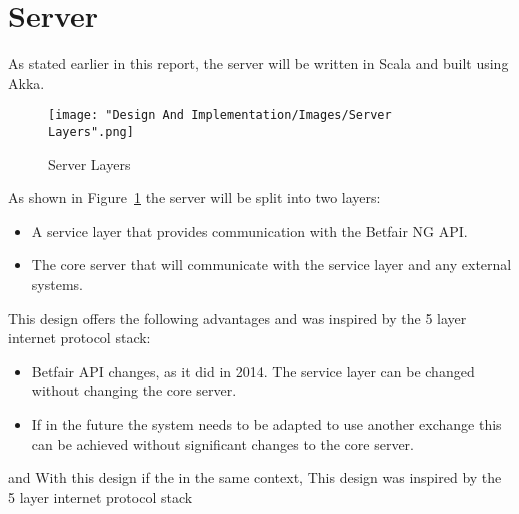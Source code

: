 \section{Server}

	As stated earlier in this report, the server will be written in Scala and built using Akka.
	
		\begin{figure}[h]
			\texttt{[image: "Design And Implementation/Images/Server Layers".png]}
			\centering
			\caption{Server Layers}
    			\label{fig:serverLayers}
		\end{figure}
	
	As shown in Figure~\ref{fig:serverLayers} the server will be split into two layers: 
		
		\begin{itemize}
			\item A service layer that provides communication with the Betfair NG API.
			\item The core server that will communicate with the service layer and any external systems.
		\end{itemize}			
	
	This design offers the following advantages and was inspired by the 5 layer internet protocol stack\cite{kurose2007computer}:
		
		\begin{itemize}
			\item Betfair API changes, as it did in 2014\cite{BetfairAPIMigration}. The service layer can be changed without changing the core server.
			\item If in the future the system needs to be adapted to use another exchange\cite{BettingExchangesCompared} this can be achieved without significant changes to the core server.
		\end{itemize}
	
	 and  With this design if the  in the same context,  This design was inspired by the 5 layer internet protocol stack
	
